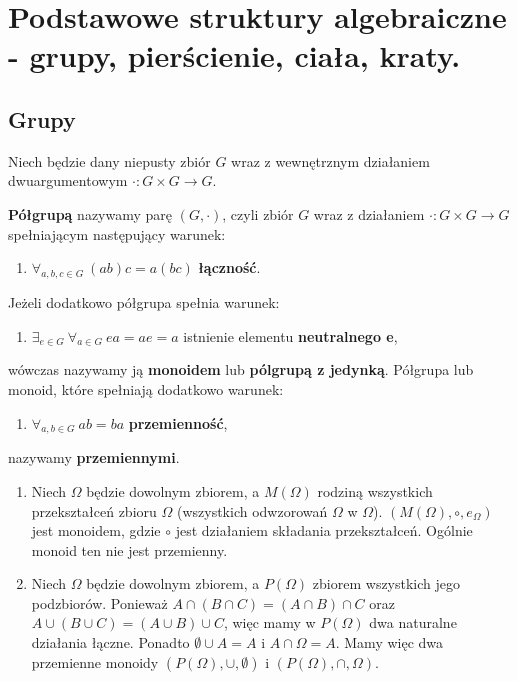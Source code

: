 \chapter{Podstawowe struktury algebraiczne - grupy, pierścienie, ciała, kraty.}
\section{Grupy}
Niech będzie dany niepusty zbiór $G$ wraz z wewnętrznym działaniem dwuargumentowym \linebreak $\cdot:G\times G\rightarrow G$.

\begin{df}
\textbf{Półgrupą} nazywamy parę $(G,\cdot)$, czyli zbiór $G$ wraz z działaniem $\cdot:G\times G\rightarrow G$ spełniającym następujący warunek:
\begin{enumerate}[\rm(1)]
\item 
$\forall_{a,b,c\in G}\ (ab)c=a(bc)$ \textbf{łączność}.
\end{enumerate}
Jeżeli dodatkowo półgrupa spełnia warunek:
\begin{enumerate}[\rm(2)]
\item 
$\exists_{e\in G}\ \forall_{a\in G}\ ea=ae=a$ istnienie elementu \textbf{neutralnego e},
\end{enumerate}
wówczas nazywamy ją \textbf{monoidem} lub \textbf{pó{l}grupą z jedynką}. Półgrupa lub monoid, które spełniają dodatkowo warunek:
\begin{enumerate}[\rm(3)]
\item 
$\forall_{a,b\in G}\ ab=ba$ \textbf{przemienność},
\end{enumerate}
nazywamy \textbf{przemiennymi}.
\end{df}

\begin{przyk}
\begin{enumerate}[\rm(1)]
\item 
Niech $\Omega$ będzie dowolnym zbiorem, a $M(\Omega)$ rodziną wszystkich przekształceń zbioru $\Omega$ (wszystkich odwzorowań $\Omega$ w $\Omega$). $(M(\Omega),\circ,e_\Omega)$ jest monoidem, gdzie $\circ$ jest działaniem składania przekształceń. Ogólnie monoid ten nie jest przemienny.
\item 
Niech $\Omega$ będzie dowolnym zbiorem, a $P(\Omega)$ zbiorem wszystkich jego podzbiorów. Ponieważ $A\cap(B\cap C)=(A\cap B)\cap C$ oraz $A\cup(B\cup C)=(A\cup B)\cup C$, więc mamy w $P(\Omega)$ dwa naturalne działania łączne. Ponadto $\emptyset\cup A=A$ i $A\cap\Omega=A$. Mamy więc dwa przemienne monoidy $(P(\Omega),\cup,\emptyset)$ i $(P(\Omega),\cap,\Omega)$.
\end{enumerate}
\end{przyk}

